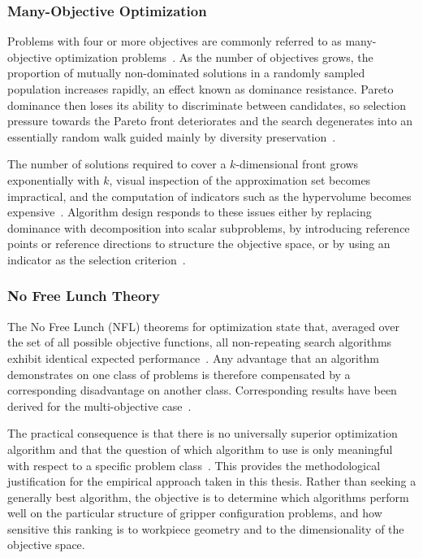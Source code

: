 \subsubsection{Many-Objective Optimization}
\label{subsubsec:many_objective_optimization}

Problems with four or more objectives are commonly referred to as many-objective optimization problems~\cite{Li2015Many-Objective}. As the number of
objectives grows, the proportion of mutually non-dominated solutions in a randomly sampled population increases rapidly, an effect known as dominance
resistance. Pareto dominance then loses its ability to discriminate between candidates, so selection pressure towards the Pareto front deteriorates
and the search degenerates into an essentially random walk guided mainly by diversity preservation~\cite{Li2015Many-Objective,VonLuecken2014A}.

The number of solutions required to cover a $k$-dimensional front grows exponentially with $k$, visual inspection of the approximation set becomes
impractical, and the computation of indicators such as the hypervolume becomes expensive~\cite{Guerreiro2020}. Algorithm design responds to these
issues either by replacing dominance with decomposition into scalar subproblems, by introducing reference points or reference directions to structure
the objective space, or by using an indicator as the selection criterion~\cite{Li2015Many-Objective,das_dennis}.

\subsubsection{No Free Lunch Theory}
\label{subsubsec:no_free_lunch}

The No Free Lunch (NFL) theorems for optimization state that, averaged over the set of all possible objective functions, all non-repeating search
algorithms exhibit identical expected performance~\cite{Adam2019No, Wolpert1997No}. Any advantage that an algorithm demonstrates on one class of
problems is therefore compensated by a corresponding disadvantage on another class. Corresponding results have been derived for the multi-objective
case~\cite{Wolpert1997No}.

The practical consequence is that there is no universally superior optimization algorithm and that the question of which algorithm to use is only
meaningful with respect to a specific problem class~\cite{Cotta1998A}. This provides the methodological justification for the empirical approach taken
in this thesis. Rather than seeking a generally best algorithm, the objective is to determine which algorithms perform well on the particular
structure of gripper configuration problems, and how sensitive this ranking is to workpiece geometry and to the dimensionality of the objective space.

